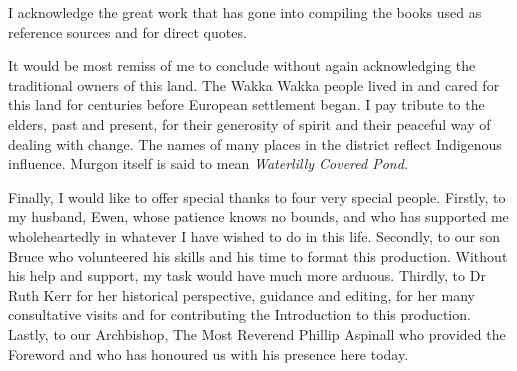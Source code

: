 I acknowledge the great work that has gone into compiling the books used as reference sources and for direct quotes.

It would be most remiss of me to conclude without again acknowledging the traditional owners of this land. The Wakka Wakka people lived in and cared for this land for centuries before European settlement began. I pay tribute to the elders, past and present, for their generosity of spirit and their peaceful way of dealing with change. The names of many places in the district reflect Indigenous influence. Murgon itself is said to mean \emph{Waterlilly Covered Pond}.

Finally, I would like to offer special thanks to four very special people. Firstly, to my husband, Ewen, whose patience knows no bounds, and who has supported me wholeheartedly in whatever I have wished to do in this life. Secondly, to our son Bruce who volunteered his skills and his time to format this production. Without his help and support, my task would have much more arduous. Thirdly, to Dr Ruth Kerr for her historical perspective, guidance and editing, for her many consultative visits and for contributing the Introduction to this production. Lastly, to our Archbishop, The Most Reverend Phillip Aspinall who provided the Foreword and who has honoured us with his presence here today.
